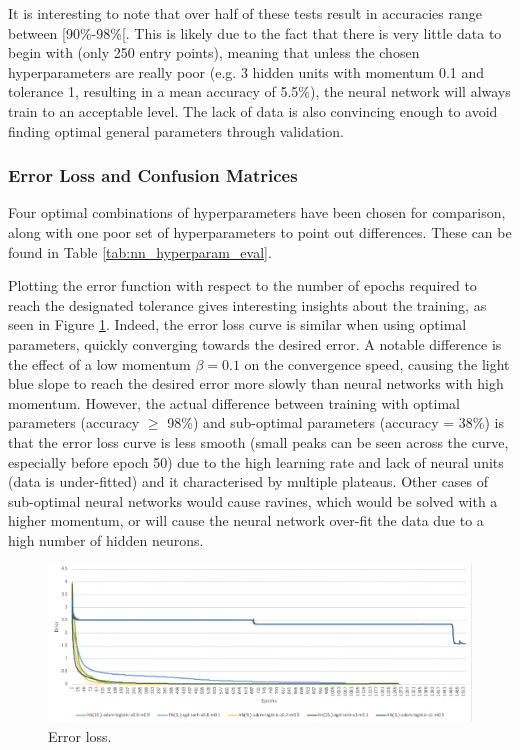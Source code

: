 \documentclass[letterpaper,12pt]{article}
\begin{document}
It is interesting to note that over half of these tests result in accuracies range between [90\%-98\%[. This is likely due to the fact that there is very little data to begin with (only 250 entry points), meaning that unless the chosen hyperparameters are really poor (e.g. 3 hidden units with momentum 0.1 and tolerance 1, resulting in a mean accuracy of 5.5\%), the neural network will always train to an acceptable level. The lack of data is also convincing enough to avoid finding optimal general parameters through validation.

\subsubsection{Error Loss and Confusion Matrices}
\label{sec:eval-errorloss-cm}

Four optimal combinations of hyperparameters have been chosen for comparison, along with one poor set of hyperparameters to point out differences. These can be found in Table \ref{tab:nn_hyperparam_eval}.



Plotting the error function with respect to the number of epochs required to reach the designated tolerance gives interesting insights about the training, as seen in Figure \ref{fig:error-loss-curve}. Indeed, the error loss curve is similar when using optimal parameters, quickly converging towards the desired error. A notable difference is the effect of a low momentum $\beta=0.1$ on the convergence speed, causing the light blue slope to reach the desired error more slowly than neural networks with high momentum. However, the actual difference between training with optimal parameters (accuracy $\geqslant$ 98\%) and sub-optimal parameters (accuracy = 38\%) is that the error loss curve is less smooth (small peaks can be seen across the curve, especially before epoch 50) due to the high learning rate and lack of neural units (data is under-fitted) and it characterised by multiple plateaus. Other cases of sub-optimal neural networks would cause ravines, which would be solved with a higher momentum, or will cause the neural network over-fit the data due to a high number of hidden neurons.

\begin{figure}[h] 
\centerline{\includegraphics[width=\textwidth]{report/figures/error_loss_curve.png}}
\caption{\label{fig:error-loss-curve}Error loss.}
\end{figure}
\end{document}
